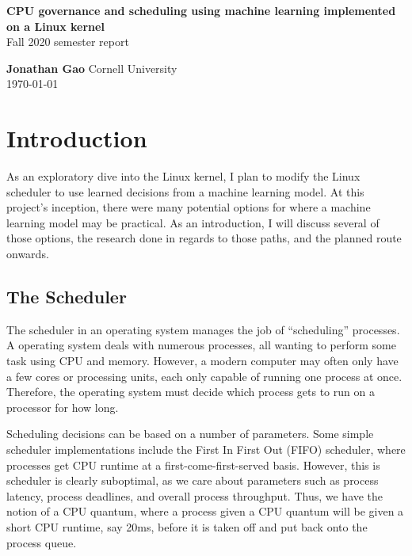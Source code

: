 \documentclass[12pt]{article}
\author{Jonathan Gao}
\def\ind{\hspace*{0.3in}}
\begin{document}
\pagestyle{plain}

\begin{titlepage}
    \begin{center}
        \vspace*{5cm}
        {\huge\textbf{CPU governance and scheduling using machine learning implemented on a Linux kernel}}\\
        \vspace{1.5cm}
        {\large Fall 2020 semester report}
        \vspace{1.5cm}
        
        \textbf{Jonathan Gao}
        \vfill
        \vspace{0.8cm}
        Cornell University\\
        \today
        
    \end{center}
\end{titlepage}

\section*{Introduction}

\ind As an exploratory dive into the Linux kernel, I plan to modify the Linux scheduler to use learned decisions from a machine learning model. At this project's inception, there were many potential options for where a machine learning model may be practical. As an introduction, I will discuss several of those options, the research done in regards to those paths, and the planned route onwards. 

\subsection*{The Scheduler}

\ind The scheduler in an operating system manages the job of ``scheduling'' processes. A operating system deals with numerous processes, all wanting to perform some task using CPU and memory. However, a modern computer may often only have a few cores or processing units, each only capable of running one process at once. Therefore, the operating system must decide which process gets to run on a processor for how long.

Scheduling decisions can be based on a number of parameters. Some simple scheduler implementations include the First In First Out (FIFO) scheduler, where processes get CPU runtime at a first-come-first-served basis. However, this is scheduler is clearly suboptimal, as we care about parameters such as process latency, process deadlines, and overall process throughput. Thus, we have the notion of a CPU quantum, where a process given a CPU quantum will be given a short CPU runtime, say 20ms, before it is taken off and put back onto the process queue.
\end{document}
